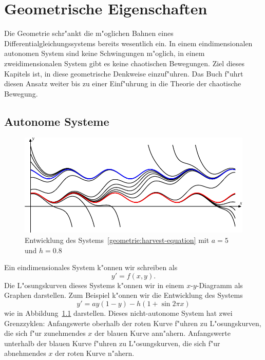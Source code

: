 %
%
%
\chapter{Geometrische Eigenschaften\label{chapter:geometrie}}
\rhead{}
Die Geometrie schr"ankt die m"oglichen Bahnen eines
Differentialgleichungssystems bereits wesentlich ein.
In einem eindimensionalen autonomen System sind keine
Schwingungen m"oglich, in einem zweidimensionalen
System gibt es keine chaotischen Bewegungen.
Ziel dieses Kapitels ist, in diese geometrische
Denkweise einzuf"uhren.
Das Buch \cite{skript:hirsch} f"uhrt diesen Ansatz weiter bis zu
einer Einf"uhrung in die Theorie der chaotische Bewegung.

\section{Autonome Systeme}
\begin{figure}
\centering
\includegraphics{chapters/images/geometrie-13.pdf}
\caption{Entwicklung des Systems~\eqref{geometrie:harvest-equation}
mit $a=5$ und $h=0.8$
\label{geometrie:harvest-graph}}
\end{figure}%
%
%
Ein eindimensionales System k"onnen wir schreiben als
\[
y'=f(x,y).
\]
Die L"osungskurven dieses Systems k"onnen wir in einem $x$-$y$-Diagramm
als Graphen darstellen.
Zum Beispiel k"onnen wir die Entwicklung des Systems
\begin{equation}
y' = ay(1-y)-h(1+\sin 2\pi x)
\label{geometrie:harvest-equation}
\end{equation}
wie in Abbildung~\ref{geometrie:harvest-graph} darstellen.
Dieses nicht-autonome System hat zwei Grenzzyklen: 
Anfangswerte oberhalb der roten Kurve f"uhren zu L"osungskurven, die
sich f"ur zunehmendes $x$ der blauen Kurve ann"ahern.
Anfangswerte unterhalb der blauen Kurve f"uhren zu L"osungskurven, die
sich f"ur abnehmendes $x$ der roten Kurve n"ahern.

